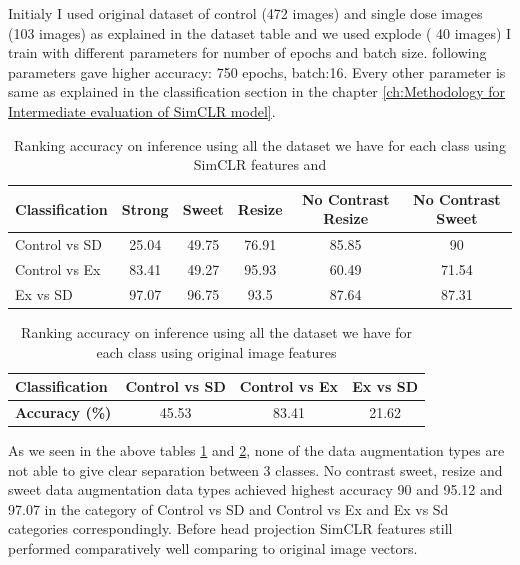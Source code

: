 Initialy I used original dataset of control (472 images) and single dose images (103 images) as explained in the dataset table and we used explode ( 40 images) 
I train with different parameters for  number of epochs and batch size. following parameters gave higher accuracy: 750 epochs, batch:16. Every other parameter is same as explained in the classification section in the chapter \ref{ch:Methodology for Intermediate evaluation of SimCLR model}.


\begin{table}[H]
  \centering
  \begin{tabular}{@{}lccccc@{}}
  \toprule
  \textbf{Classification} & \textbf{Strong} & \textbf{Sweet} & \textbf{Resize} & \textbf{No Contrast Resize} & \textbf{No Contrast Sweet} \\ \midrule
  Control vs SD             & 25.04            & 49.75           & 76.91          & 85.85                         & 90                        \\
  Control vs Ex             & 83.41            & 49.27               & 95.93           & 60.49                          &    71.54                 \\
  Ex vs SD                & 97.07           & 96.75          & 93.5           & 87.64                       & 87.31                        \\ \bottomrule
  \end{tabular}
  \caption{Ranking accuracy on inference using all the dataset we have for each class using SimCLR features and}
  \label{tab:ranking_softmax}
\end{table}

\begin{table}[H]
  \centering
  \begin{tabular}{@{}lccc@{}}
  \toprule
  \textbf{Classification}     & \textbf{Control vs SD} & \textbf{Control vs Ex} & \textbf{Ex vs SD} \\ \midrule
  \textbf{Accuracy (\%)}      & 45.53                  & 83.41                  & 21.62             \\ \bottomrule
  \end{tabular}
  \caption{Ranking accuracy on inference using all the dataset we have for each class using original image features}
  \label{tab:classification_accuracies}
  \end{table}
  
As we seen in the above tables \ref{tab:ranking_softmax} and \ref{tab:classification_accuracies}, none of the  data augmentation types are not able to give clear separation between 3 classes. No contrast sweet, resize and sweet data augmentation data types achieved highest accuracy 90 and 95.12 and 97.07  in the category of  Control vs SD and Control vs Ex and Ex vs Sd categories correspondingly. Before head projection SimCLR features still performed comparatively well comparing to original image vectors.

